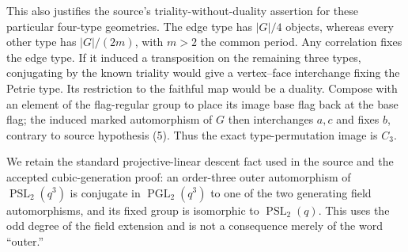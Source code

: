 \documentclass[11pt,a4paper]{article}
\newcommand{\PSL}{\operatorname{PSL}}
\begin{document}
This also justifies the source's triality-without-duality assertion for
these particular four-type geometries. The edge type has $|G|/4$ objects,
whereas every other type has $|G|/(2m)$, with $m>2$ the common period.
Any correlation fixes the edge type. If it induced a transposition on the
remaining three types, conjugating by the known triality would give a
vertex--face interchange fixing the Petrie type. Its restriction to the
faithful map would be a duality. Compose with an element of the flag-regular
group to place its image base flag back at the base flag; the induced marked
automorphism of $G$ then interchanges $a,c$ and fixes $b$, contrary to source
hypothesis (5). Thus the exact type-permutation image is $C_3$.

We retain the standard projective-linear
descent fact used in the source and the accepted cubic-generation proof:
an order-three outer automorphism of $\PSL_2(q^3)$ is conjugate in
$\operatorname{PGL}_2(q^3)$ to one of the two generating field automorphisms,
and its fixed group is isomorphic to $\PSL_2(q)$. This uses the odd degree
of the field extension and is not a consequence merely of the word ``outer.''
\end{document}

